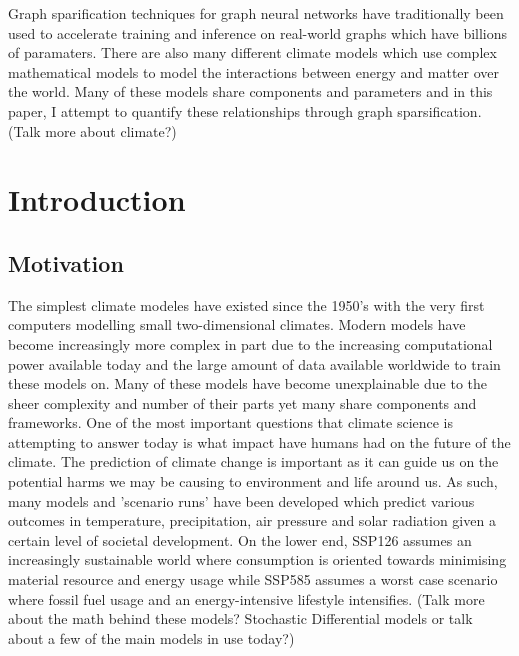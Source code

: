 \documentclass[honours,12pt]{unswthesis}
\newcommand\blankpage{%
    \null
    \thispagestyle{empty}%
    \addtocounter{page}{-1}%
    \newpage}
\numberwithin{equation}{section}
\begin{document}
\afterpage{\blankpage}



Graph sparification techniques for graph neural networks have traditionally been used to accelerate training and inference on real-world graphs which have billions of paramaters.
There are also many different climate models which use complex mathematical models to model the interactions between energy and matter over the world. 
Many of these models share components and parameters and in this paper, I attempt to quantify these relationships through graph sparsification. (Talk more about climate?)
\afterpage{\blankpage}


\afterpreface

%
%

\afterpage{\blankpage}

\chapter{Introduction}\label{s-intro}

{\section{Motivation}}\label{motivation}

{\noindent} The simplest climate modeles have existed since the 1950's with the very first computers modelling small two-dimensional climates. 
Modern models have become increasingly more complex in part due to the increasing computational power available today and the large amount of data available
worldwide to train these models on. Many of these models have become unexplainable due to the sheer complexity and number of their parts yet many share components
and frameworks. One of the most important questions that climate science is attempting to answer today is what impact have humans had on the future of the climate.
The prediction of climate change is important as it can guide us on the potential harms we may be causing to environment and life around us. As such, many models
and 'scenario runs' have been developed which predict various outcomes in temperature, precipitation, air pressure and solar radiation given a certain level of 
societal development. On the lower end, SSP126 assumes an increasingly sustainable world where consumption is oriented towards minimising material resource and energy usage
while SSP585 assumes a worst case scenario where fossil fuel usage and an energy-intensive lifestyle intensifies.
(Talk more about the math behind these models? Stochastic Differential models or talk about a few of the main models in use today?)
\end{document}
